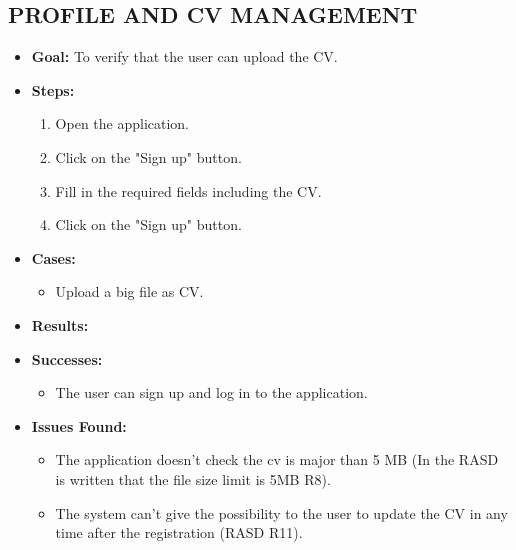 \subsection{PROFILE AND CV MANAGEMENT}\label{subsec:profile-and-cv-management}
\begin{itemize}
    \item \textbf{Goal:} To verify that the user can upload the CV.

    \item \textbf{Steps:}
    \begin{enumerate}
        \item Open the application.
        \item Click on the "Sign up" button.
        \item Fill in the required fields including the CV.
        \item Click on the "Sign up" button.
    \end{enumerate}
    \item \textbf{Cases:}
    \begin{itemize}
        \item Upload a big file as CV.
    \end{itemize}
    \item \textbf{Results:}
    \item \textbf{Successes:}
    \begin{itemize}
        \item The user can sign up and log in to the application.
    \end{itemize}
    \item \textbf{Issues Found:}
    \begin{itemize}
        \item The application doesn't check the cv is major than 5 MB (In the RASD is written that the file size limit is 5MB R8).
        \item The system can't give the possibility to the user to update the CV in any time after the registration (RASD R11).
    \end{itemize}
\end{itemize}


